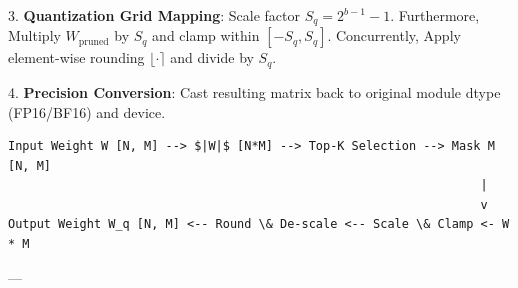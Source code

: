 3. \textbf{Quantization Grid Mapping}:
Scale factor $S_q = 2^{b-1} - 1$. Furthermore, Multiply $W_{\text{pruned}}$ by $S_q$ and clamp within $[-S_q, S_q]$. Concurrently, Apply element-wise rounding $\lfloor \cdot \rceil$ and divide by $S_q$.

4. \textbf{Precision Conversion}:
Cast resulting matrix back to original module dtype (FP16/BF16) and device.



\begin{lstlisting}
Input Weight W [N, M] --> $|W|$ [N*M] --> Top-K Selection --> Mask M [N, M]
                                                                  |
                                                                  v
Output Weight W_q [N, M] <-- Round \& De-scale <-- Scale \& Clamp <- W * M
\end{lstlisting}


---